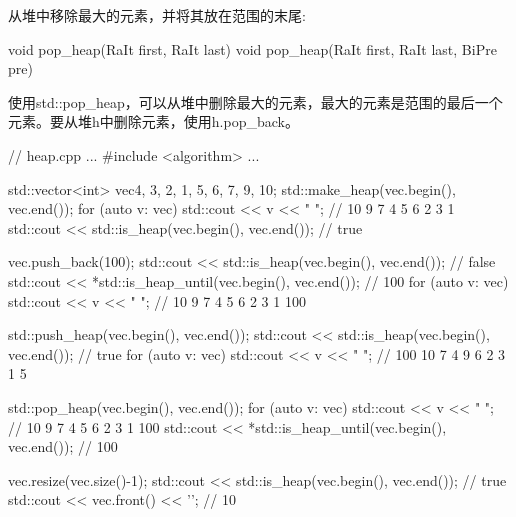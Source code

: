 从堆中移除最大的元素，并将其放在范围的末尾:

\begin{cpp}
void pop_heap(RaIt first, RaIt last)
void pop_heap(RaIt first, RaIt last, BiPre pre)
\end{cpp}

使用std::pop\_heap，可以从堆中删除最大的元素，最大的元素是范围的最后一个元素。要从堆h中删除元素，使用h.pop\_back。


\begin{cpp}
// heap.cpp
...
#include <algorithm>
...

std::vector<int> vec{4, 3, 2, 1, 5, 6, 7, 9, 10};
std::make_heap(vec.begin(), vec.end());
for (auto v: vec) std::cout << v << " "; // 10 9 7 4 5 6 2 3 1
std::cout << std::is_heap(vec.begin(), vec.end()); // true

vec.push_back(100);
std::cout << std::is_heap(vec.begin(), vec.end()); // false
std::cout << *std::is_heap_until(vec.begin(), vec.end()); // 100
for (auto v: vec) std::cout << v << " "; // 10 9 7 4 5 6 2 3 1 100

std::push_heap(vec.begin(), vec.end());
std::cout << std::is_heap(vec.begin(), vec.end()); // true
for (auto v: vec) std::cout << v << " "; // 100 10 7 4 9 6 2 3 1 5

std::pop_heap(vec.begin(), vec.end());
for (auto v: vec) std::cout << v << " "; // 10 9 7 4 5 6 2 3 1 100
std::cout << *std::is_heap_until(vec.begin(), vec.end()); // 100

vec.resize(vec.size()-1);
std::cout << std::is_heap(vec.begin(), vec.end()); // true
std::cout << vec.front() << '\n'; // 10
\end{cpp}













































